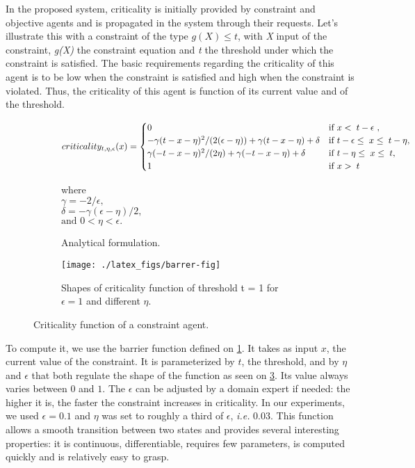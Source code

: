 In the proposed system, criticality is initially provided by constraint and objective agents and is propagated in the system through their requests.
Let's illustrate this with a constraint of the type \(g(X) \leq t\), with \emph{X} input of the constraint, \emph{g(X)} the constraint equation and \emph{t} the threshold under which the constraint is satisfied. The basic requirements regarding the criticality of this agent is to be low when the constraint is satisfied and high when the constraint is violated. Thus, the criticality of this agent is function of its current value and of the threshold.

\begin{figure}
	\centering
	\begin{subfigure}[b]{\textwidth}
	\centering
	\scriptsize
	
		\[criticality_{t,\eta,\epsilon}(x)=
			\begin{cases}
				0		&\text{if \( x < \; t - \epsilon \) },\\
				-\gamma ( t - x - \eta ) ^ 2 / ( 2 ( \epsilon - \eta)) + \gamma ( t - x - \eta ) + \delta &\text{if \(t - \epsilon \leq \;x \leq \;t - \eta \)},\\
				\gamma (-t-x-\eta)^2/(2 \eta)+\gamma (-t-x-\eta) + \delta &\text{if \(t - \eta \leq \;x \leq \;t\)},\\
				1	&\text{if \( x > \; t \)}
			\end{cases}\]

		where\\
		$\gamma = -2/ \epsilon,$\\
		$\delta = -\gamma (\epsilon - \eta )/2,$\\
		$\text{and } 0 < \eta < \epsilon.$
	\caption{Analytical formulation.}\label{crit_func}
	\end{subfigure}
	
	\begin{subfigure}[b]{\textwidth}
		\centering
		\texttt{[image: ./latex\_figs/barrer-fig]}
		\caption{Shapes of criticality function of threshold t = 1 for \(\epsilon=1\) and different \(\eta\).}\label{crit_shapes}
	\end{subfigure}
	
\caption{Criticality function of a constraint agent.}
\end{figure}

To compute it, we use the barrier function defined on \figurename{} \ref{crit_func}. It takes as input \(x\), the current value of the constraint. It is parameterized by \(t\), the threshold, and by \(\eta\) and \(\epsilon\) that both regulate the shape of the function as seen on \figurename{} \ref{crit_shapes}. Its value always varies between \(0\) and \(1\).
The \(\epsilon\) can be adjusted by a domain expert if needed: the higher it is, the faster the constraint increases in criticality.
In our experiments, we used $\epsilon = 0.1$ and $\eta$ was set to roughly a third of $\epsilon$, \textit{i.e.} 0.03.
This function allows a smooth transition between two states and provides several interesting properties: it is continuous, differentiable, requires few parameters, is computed quickly and is relatively easy to grasp.

